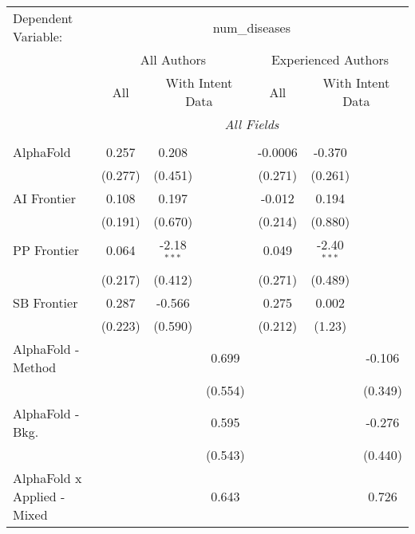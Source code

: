 \begingroup
\centering
\begin{tabular}{lcccccc}
   \tabularnewline \midrule \midrule
   Dependent Variable: & \multicolumn{6}{c}{num\_diseases}\\
 & \multicolumn{3}{c}{All Authors} & \multicolumn{3}{c}{Experienced Authors} \\
\cmidrule(lr){2-4} \cmidrule(lr){5-7}
 & \multicolumn{1}{c}{All} & \multicolumn{2}{c}{With Intent Data} & \multicolumn{1}{c}{All} & \multicolumn{2}{c}{With Intent Data} \\
\cmidrule(lr){2-2} \cmidrule(lr){3-4} \cmidrule(lr){5-5} \cmidrule(lr){6-7}
 & \multicolumn{6}{c}{\textit{All Fields}} \\ \\
   AlphaFold                   & 0.257   & 0.208         &               & -0.0006 & -0.370        &   \\   
                               & (0.277) & (0.451)       &               & (0.271) & (0.261)       &   \\   
   AI Frontier                 & 0.108   & 0.197         &               & -0.012  & 0.194         &   \\   
                               & (0.191) & (0.670)       &               & (0.214) & (0.880)       &   \\   
   PP Frontier                 & 0.064   & -2.18$^{***}$ &               & 0.049   & -2.40$^{***}$ &   \\   
                               & (0.217) & (0.412)       &               & (0.271) & (0.489)       &   \\   
   SB Frontier                 & 0.287   & -0.566        &               & 0.275   & 0.002         &   \\   
                               & (0.223) & (0.590)       &               & (0.212) & (1.23)        &   \\   
   AlphaFold - Method          &         &               & 0.699         &         &               & -0.106\\   
                               &         &               & (0.554)       &         &               & (0.349)\\   
   AlphaFold - Bkg.            &         &               & 0.595         &         &               & -0.276\\   
                               &         &               & (0.543)       &         &               & (0.440)\\   
   AlphaFold x Applied - Mixed &         &               & 0.643         &         &               & 0.726\\   

\end{tabular}
